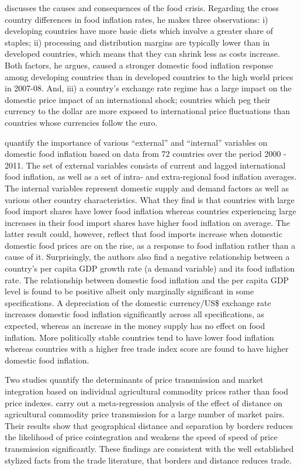 \documentclass[12pt,english]{article}
\begin{document}
\citet{Abbott2009} discusses the causes and consequences of the food crisis. Regarding the cross country differences in food inflation rates, he makes three observations: i) developing countries have more basic diets which involve a greater share of staples; ii) processing and distribution margins are typically lower than in developed countries, which means that they can shrink less as costs increase. Both factors, he argues, caused a stronger domestic food inflation response among developing countries than in developed countries to the high world prices in 2007-08. And, iii) a country's exchange rate regime has a large impact on the domestic price impact of an international shock; countries which peg their currency to the dollar are more exposed to international price fluctuations than countries whose currencies follow the euro.

\citet{Lee2013} quantify the importance of various ``external'' and ``internal'' variables on domestic food inflation based on data from 72 countries over the period 2000 - 2011. The set of external variables consists of current and lagged international food inflation, as well as a set of intra- and extra-regional food inflation averages. The internal variables represent domestic supply and demand factors as well as various other country characteristics. What they find is that  countries with large food import shares have lower food inflation whereas countries experiencing large increases in their food import shares have higher food inflation on average. The latter result could, however, reflect that food imports increase when domestic domestic food prices are on the rise, as a response to food inflation rather than a cause of it. Surprisingly, the authors also find a negative relationship between a country's per capita GDP growth rate (a demand variable) and its food inflation rate. The relationship between domestic food inflation and the per capita GDP level is found to be positive albeit only marginally significant in some specifications. A depreciation of the domestic currency/US\$ exchange rate increases domestic food inflation significantly across all specifications, as expected, whereas an increase in the money supply has no effect on food inflation. More politically stable countries tend to have lower food inflation whereas countries with a higher free trade index score are found to have higher domestic food inflation.

Two studies quantify the determinants of price transmission and market integration based on individual agricultural commodity prices rather than food price indexes. \citet{kouyate16} carry out a meta-regression analysis of the effect of distance on agricultural commodity price transmission for a large number of market pairs. Their results show that geographical distance and separation by borders reduces the likelihood of price cointegration and weakens the speed of speed of price transmission significantly. These findings are consistent with the well established stylized facts from the trade literature, that borders and distance reduces trade.
\end{document}
